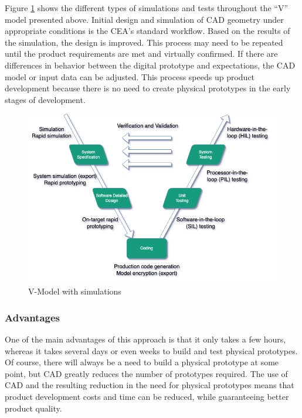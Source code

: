     Figure \ref{fig:v-model-sim} shows the different types of simulations and tests throughout the “V” model presented above. Initial design and simulation of CAD geometry under appropriate conditions is the CEA's standard workflow. Based on the results of the simulation, the design is improved. This process may need to be repeated until the product requirements are met and virtually confirmed. If there are differences in behavior between the digital prototype and expectations, the CAD model or input data can be adjusted. This process speeds up product development because there is no need to create physical prototypes in the early stages of development.

    \begin{figure}[H]
        \centering
        \includegraphics[scale=0.6]{images/Foundation-V-Model-Sim.drawio.png}
        \caption{\label{fig:v-model-sim} V-Model with simulations }
    \end{figure}


    \subsubsection{Advantages}
    One of the main advantages of this approach is that it only takes a few hours, whereas it takes several days or even weeks to build and test physical prototypes. Of course, there will always be a need to build a physical prototype at some point, but CAD greatly reduces the number of prototypes required. The use of CAD and the resulting reduction in the need for physical prototypes means that product development costs and time can be reduced, while guaranteeing better product quality.\\

